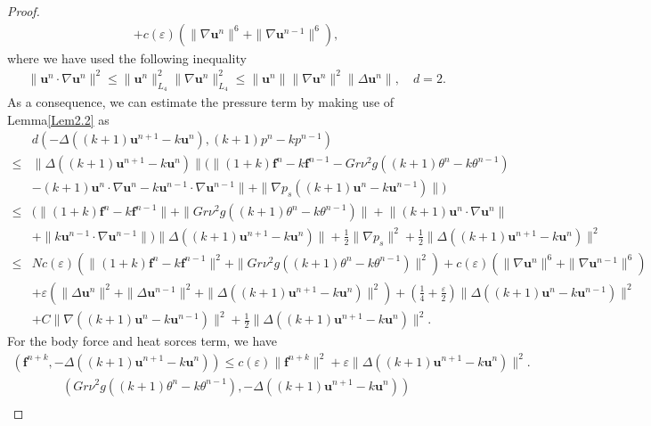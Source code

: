 \documentclass[10pt]{article}
\begin{document}
\begin{proof}
\begin{align}
			&+c(\varepsilon){ (\|\nabla\bm{u}^{n}\|^6+\|\nabla \bm{u}^{n-1}\|^6)},
		\end{align}
		where we have used the following inequality \cite{J2007}
		\begin{align*}
			&\|\bm{u}^n\cdot\nabla\bm{u}^n\|^2\leq\|\bm{u}^n\|_{L_4}^2\|\nabla\bm{u}^n\|_{L_4}^2\leq\|\bm{u}^n\|\|\nabla\bm{u}^n\|^2\|\Delta\bm{u}^n\|,  \quad    d=2.
		\end{align*}
		As a consequence, we can estimate the pressure term by making use of Lemma\ref{Lem2.2} as
		\begin{align}
			&d(-\Delta((k+1)\bm{u}^{n+1}-k\bm{u}^n),(k+1)p^n-kp^{n-1})\nonumber\\
			\leq &\|\Delta((k+1)\bm{u}^{n+1}-k\bm{u}^n)\|(\|(1+k)\bm{f}^n-k\bm{f}^{n-1}-Gr\nu^2g((k+1)\theta^n-k\theta^{n-1})\nonumber\\
			&  { -(k+1)\bm{u}^n\cdot\nabla\bm{u}^n-k\bm{u}^{n-1}\cdot\nabla\bm{u}^{n-1}\|}+\|\nabla p_s((k+1)\bm{u}^n-k\bm{u}^{n-1})\|)\nonumber\\
			\leq &(\|(1+k)\bm{f}^n-k\bm{f}^{n-1}\|+\|Gr\nu^2g((k+1)\theta^n-k\theta^{n-1})\|+{ \|(k+1)\bm{u}^n\cdot\nabla\bm{u}^n\|}\nonumber\\
			&  +\|k\bm{u}^{n-1}\cdot\nabla\bm{u}^{n-1}\|)\|\Delta((k+1)\bm{u}^{n+1}-k\bm{u}^n)\|+\frac{1}{2}\|\nabla p_s\|^2+\frac{1}{2}\|\Delta((k+1)\bm{u}^{n+1}-k\bm{u}^n)\|^2\nonumber\\
			\leq & Nc(\varepsilon)(\|(1+k)\bm{f}^n-k\bm{f}^{n-1}\|^2+\|Gr\nu^2g((k+1)\theta^n-k\theta^{n-1})\|^2)+c(\varepsilon)({ \|\nabla\bm{u}^{n}\|^6+\|\nabla \bm{u}^{n-1}\|^6})\nonumber\\
			&  +\varepsilon(\|\Delta\bm{u}^n\|^2+\|\Delta\bm{u}^{n-1}\|^2+\|\Delta((k+1)\bm{u}^{n+1}-k\bm{u}^n)\|^2)+(\frac{1}{4}+\frac{\varepsilon}{2})\|\Delta((k+1)\bm{u}^{n}-k\bm{u}^{n-1})\|^2\nonumber\\
			&  +C\|\nabla((k+1)\bm{u}^{n}-k\bm{u}^{n-1})\|^2+\frac{1}{2}\|\Delta((k+1)\bm{u}^{n+1}-k\bm{u}^n)\|^2.
		\end{align}
		For the body force and heat sorces term, we have
		\begin{align}\label{3.22}
			(\bm{f}^{n+k},-\Delta((k+1)\bm{u}^{n+1}-k\bm{u}^n)) \leq c(\varepsilon)\|\bm{f}^{n+k}\|^2+\varepsilon\|\Delta((k+1)\bm{u}^{n+1}-k\bm{u}^n)\|^2. 
		\end{align}
		\begin{align}\label{3.23}
			&(Gr\nu^2g((k+1)\theta^n-k\theta^{n-1}),-\Delta((k+1)\bm{u}^{n+1}-k\bm{u}^n))\nonumber\\

\end{align}
\end{proof}
\end{document}
